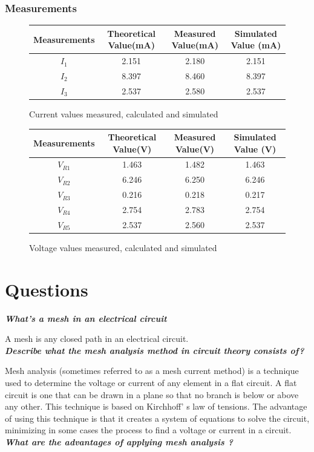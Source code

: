 \documentclass[letterpaper]{article}
\begin{document}
\subsubsection{Measurements}
\begin{figure}[H]
    \centering
    \begin{tabular}{|c|c|c|c|}\hline
        Measurements & Theoretical Value(\si{\milli\ampere}) & Measured Value(\si{\milli\ampere}) &
        Simulated Value (\si{\milli\ampere})\\\hline
        $I_{1}$ & 2.151 & 2.180 & 2.151 \\\hline
        $I_{2}$ & 8.397 & 8.460 & 8.397 \\\hline
        $I_{3}$ & 2.537 & 2.580 & 2.537 \\\hline
    \end{tabular}
    \caption{Current values measured, calculated and simulated}
\end{figure}
\begin{figure}[H]
    \centering
    \begin{tabular}{|c|c|c|c|}\hline
        Measurements & Theoretical Value(\si{\volt}) & Measured Value(\si{\volt}) &
        Simulated Value (\si{\volt})\\\hline
        $V_{R1}$ & 1.463 & 1.482 & 1.463 \\\hline 
        $V_{R2}$ & 6.246 & 6.250 & 6.246 \\\hline 
        $V_{R3}$ & 0.216 & 0.218 & 0.217 \\\hline 
        $V_{R4}$ & 2.754 & 2.783 & 2.754 \\\hline 
        $V_{R5}$ & 2.537 & 2.560 & 2.537 \\\hline 
    \end{tabular}
    \caption{Voltage values measured, calculated and simulated}
\end{figure}
\section{Questions}
\textit{\textbf{What's a mesh in an electrical circuit}}

A mesh is any closed path in an electrical circuit.\\
\textit{\textbf{Describe what the mesh analysis method in circuit theory consists of?}}

Mesh analysis (sometimes referred to as a mesh current method) is a technique used to determine the voltage 
or current of any element in a flat circuit. A flat circuit is one that can be drawn in 
a plane so that no branch is below or above any other. This technique is based on Kirchhoff'
s law of tensions. The advantage of using this technique is that it creates a system of equations to 
solve the circuit, minimizing in some cases the process to find a voltage or current in a circuit.\\
\textit{\textbf{What are the advantages of applying mesh analysis ?}}
\end{document}
